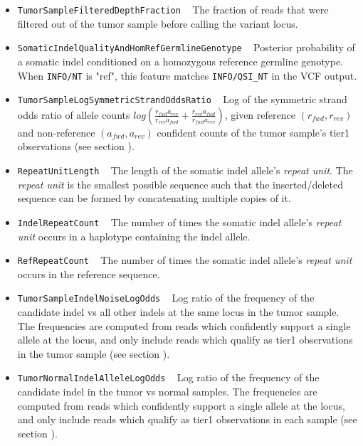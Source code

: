 \documentclass{article}
\begin{document}
\begin{itemize}
    \item \texttt{TumorSampleFilteredDepthFraction} ~ The fraction of reads that were filtered out of the tumor sample before calling the variant locus.

    \item \texttt{SomaticIndelQualityAndHomRefGermlineGenotype} ~ Posterior probability of a somatic indel conditioned on a homozygous reference germline genotype. When \texttt{INFO/NT} is "ref", this feature matches \texttt{INFO/QSI\_NT} in the VCF output.

    \item \texttt{TumorSampleLogSymmetricStrandOddsRatio} ~ Log of the symmetric strand odds ratio of allele counts $log{\left( \frac{r_{fwd} a_{rev}} {r_{rev} a_{fwd}} + \frac{r_{rev} a_{fwd}} {r_{fwd} a_{rev}}\right)}$, given reference $(r_{fwd},r_{rev})$ and non-reference $(a_{fwd},a_{rev})$ confident counts of the tumor sample's tier1 observations (see section ).

    \item \texttt{RepeatUnitLength} ~ The length of the somatic indel allele's \emph{repeat unit}. The \emph{repeat unit} is the smallest possible sequence such that the inserted/deleted sequence can be formed by concatenating multiple copies of it.

    \item \texttt{IndelRepeatCount} ~ The number of times the somatic indel allele's \emph{repeat unit} occurs in a haplotype containing the indel allele.

    \item \texttt{RefRepeatCount} ~ The number of times the somatic indel allele's \emph{repeat unit} occurs in the reference sequence.

    \item \texttt{TumorSampleIndelNoiseLogOdds} ~ Log ratio of the frequency of the candidate indel vs all other indels at the same locus in the tumor sample. The frequencies are computed from reads which confidently support a single allele at the locus, and only include reads which qualify as tier1 observations in the tumor sample (see section ).

    \item \texttt{TumorNormalIndelAlleleLogOdds} ~ Log ratio of the frequency of the candidate indel in the tumor vs normal samples. The frequencies are computed from reads which confidently support a single allele at the locus, and only include reads which qualify as tier1 observations in each sample (see section ).


\end{itemize}
\end{document}
